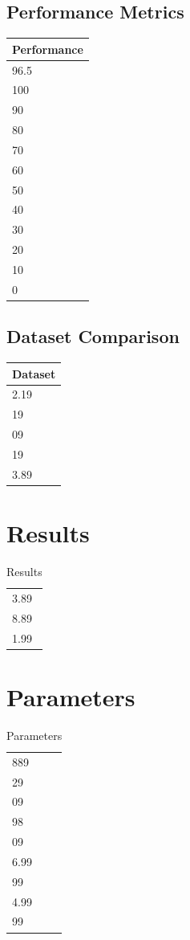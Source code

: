 \documentclass[twocolumn]{svjour3}
\begin{document}
\subsection{Performance Metrics}
\begin{tabular}{|l|}
\hline
\textbf{Performance} \\
\hline
96.5 \\
100 \\
90 \\
80 \\
70 \\
60 \\
50 \\
40 \\
30 \\
20 \\
10 \\
0 \\
\hline
\end{tabular}
\subsection{Dataset Comparison}
\begin{tabular}{|l|}
\hline
\textbf{Dataset} \\
\hline
2.19 \\
19 \\
09 \\
19 \\
3.89 \\
\hline
\end{tabular}

\section{Results}
\begin{table}
\centering
\caption{Results}
\begin{tabular}{l}
\hline
3.89 \\
8.89 \\
1.99 \\
\hline
\end{tabular}
\end{table}
\section{Parameters}
\begin{table}
\centering
\caption{Parameters}
\begin{tabular}{l}
\hline
889 \\
29 \\
09 \\
98 \\
09 \\
6.99 \\
99 \\
4.99 \\
99 \\
\hline
\end{tabular}
\end{table}
\end{document}
